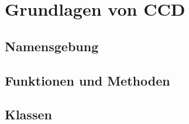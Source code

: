 \chapter{Grundlagen von CCD}
\label{cha:GrundlagenVonCCD}

\section{Namensgebung}

\section{Funktionen und Methoden}

\section{Klassen}